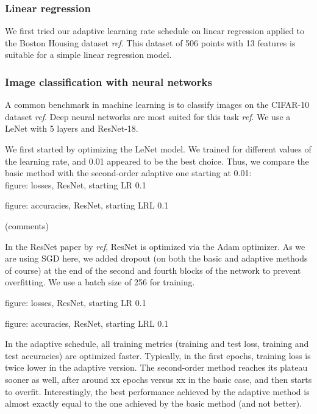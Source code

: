 \documentclass{article}
\begin{document}
  \subsubsection{Linear regression}
  
  We first tried our adaptive learning rate schedule on linear regression applied to the Boston Housing dataset \emph{ref}. This dataset of 506 points with 13 features is suitable for a simple linear regression model. 
  
  \subsubsection{Image classification with neural networks}
  
  A common benchmark in machine learning is to classify images on the CIFAR-10 dataset \emph{ref}. Deep neural networks are most suited for this task \emph{ref}. We use a LeNet with 5 layers and ResNet-18. 
  
  We first started by optimizing the LeNet model. We trained for different values of the learning rate, and 0.01 appeared to be the best choice. Thus, we compare the basic method with the second-order adaptive one starting at 0.01:\\
  
  figure: losses, ResNet, starting LR 0.1

  figure: accuracies, ResNet, starting LRL 0.1

  (comments)
  
  In the ResNet paper by \emph{ref}, ResNet is optimized via the Adam optimizer. As we are using SGD here, we added dropout (on both the basic and adaptive methods of course) at the end of the second and fourth blocks of the network to prevent overfitting. We use a batch size of 256 for training.
  
  figure: losses, ResNet, starting LR 0.1
  
  figure: accuracies, ResNet, starting LRL 0.1
  
  In the adaptive schedule, all training metrics (training and test loss, training and test accuracies) are optimized faster. Typically, in the first epochs, training loss is twice lower in the adaptive version. The second-order method reaches its plateau sooner as well, after around xx epochs versus xx in the basic case, and then starts to overfit. Interestingly, the best performance achieved by the adaptive method is almost exactly equal to the one achieved by the basic method (and not better). 
  
\end{document}
